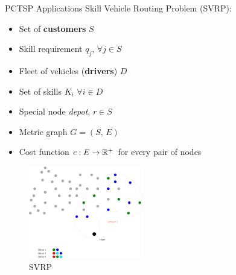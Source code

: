 \begin{frame}[t]{PCTSP Applications}
    Skill Vehicle Routing Problem (SVRP):
    \begin{minipage}[t]{0.48\textwidth}
        \begin{itemize}
            \item Set of \textbf{customers} $S$
            \item Skill requirement $q_j$,  $\forall j \in S$
            \item Fleet of vehicles (\textbf{drivers}) $D$
            \item Set of skills $K_i$ $\forall i \in D$
            \item Special node \emph{depot}, $r \in S$
            \item Metric graph $G = (S, \, E)$            
            \item Cost function $c:E \rightarrow \mathbb{R}^+$ for every pair of nodes
        \end{itemize}
    \end{minipage}
    \begin{minipage}[t]{0.48\textwidth}
        \begin{figure}
            \centering
            \includegraphics[width=5cm]{VRPSS02.pdf}
            \caption{SVRP}
            \label{fig:VRPSS02}
        \end{figure}            
    \end{minipage}    
\end{frame}

